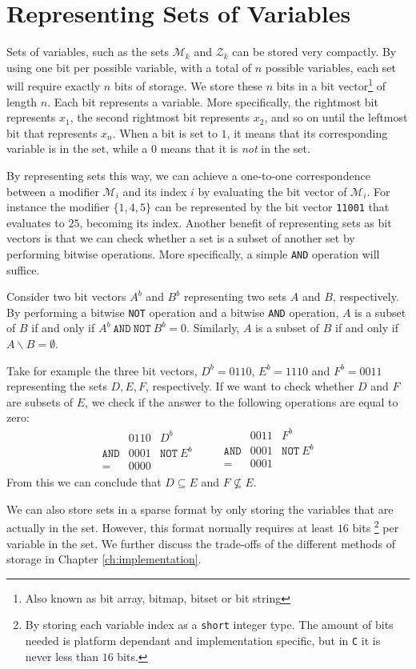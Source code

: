 \section{Representing Sets of Variables}
Sets of variables, such as the sets $\mathcal{M}_k$ and $\mathcal{Z}_k$ can be
stored very compactly.
By using one bit per possible variable, with a total of $n$ possible variables,
each set will require exactly $n$ bits of storage.
We store these $n$ bits in a bit vector\footnote{Also known as bit array,
bitmap, bitset or bit string} of length $n$.
Each bit represents a variable. More specifically, the rightmost bit represents
$x_1$, the second rightmost bit represents $x_2$, and so on until the leftmost
bit that represents $x_n$.
When a bit is set to $1$, it means that its corresponding variable is in
the set, while a $0$ means that it is \emph{not} in the set.

By representing sets this way, we can achieve a one-to-one correspondence
between a modifier $\mathcal{M}_i$ and its index $i$ by evaluating the bit
vector of $\mathcal{M}_i$. For instance the modifier $\{ {1,4,5} \}$ can be
represented by the bit vector \texttt{11001} that evaluates to $25$, becoming
its index. Another benefit of representing sets as bit vectors is
that we can check whether a set is a
subset of another set by performing bitwise operations. More specifically,
a simple \texttt{AND} operation will suffice.

Consider two bit vectors $A^b$ and $B^b$ representing two sets $A$ and
$B$, respectively.
By performing a bitwise \texttt{NOT} operation and a bitwise \texttt{AND}
operation, $A$ is a subset of $B$ if and only if
$A^b~\texttt{AND}~\texttt{NOT}~B^b = 0$.
Similarly, $A$ is a subset of $B$ if and only if $A \backslash B = \emptyset$.

Take for example the three bit vectors, $D^b = 0110$, $E^b = 1110$ and
$F^b = 0011$ representing the sets $D, E, F$, respectively.
If we want to check whether $D$ and $F$ are subsets of $E$, we check if the
answer to the following operations are equal to zero:
\[
\begin{array}{lrl}
                 & 0110 & D^b \\
    \texttt{AND} & 0001 & \texttt{NOT}~E^b \\ \hline
    =            & 0000
\end{array}
\qquad
\begin{array}{lrl}
                 & 0011 & F^b \\
    \texttt{AND} & 0001 & \texttt{NOT}~E^b \\ \hline
    =            & 0001 \\
\end{array}
\]
From this we can conclude that $D \subseteq E$ and $F \not\subseteq E$.

We can also store sets in a sparse
format by only storing the variables that are actually in the set. However,
this format normally requires at least $16$ bits\nolinebreak
\footnote{By storing each variable index as a \texttt{short} integer type.
The amount of bits needed is platform dependant and implementation specific,
but in \texttt{C} it is never less than $16$ bits.}
per variable in the set.
We further discuss the trade-offs of the different methods of storage in
Chapter \ref{ch:implementation}.

